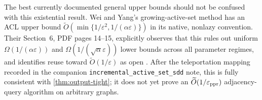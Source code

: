 The best currently documented general upper bounds should not be confused
with this existential result.  Wei and Yang's growing-active-set method has
an ACL upper bound
$\widetilde O(\min\{1/\varepsilon^2,1/(\alpha\varepsilon)\})$ in its native,
nonlazy convention.  Their Section~6, PDF pages 14--15, explicitly observes
that this rules out uniform
$\Omega(1/(\alpha\varepsilon))$ and
$\Omega(1/(\sqrt\alpha\varepsilon))$ lower bounds across all parameter
regimes, and identifies reuse toward $\widetilde O(1/\varepsilon)$ as open
\citep{wei2026simple}.  After the teleportation mapping recorded in the
companion \texttt{incremental\_active\_set\_sdd} note, this is fully
consistent with \cref{thm:output-tight}; it does not yet prove an
$\widetilde O(1/\varepsilon_{\mathrm{ppr}})$ adjacency-query algorithm on arbitrary graphs.

